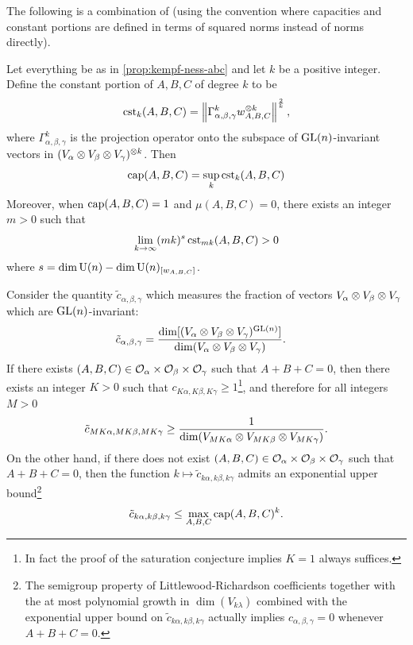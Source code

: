 \documentclass[notitlepage, 10pt]{article}
\begin{document}
The following is a combination of \cite[Theorem 1 \& Proposition 3.1]{franks2020minimal} (using the convention where capacities and constant portions are defined in terms of squared norms instead of norms directly).
\begin{thm}
    Let everything be as in \cref{prop:kempf-ness-abc} and let $k$ be a positive integer.
    Define the constant portion of $A,B,C$ of degree $k$ to be
    \begin{equation}
        \operatorname{cst}_{k}(A,B,C) = \left\lVert\Gamma_{\alpha,\beta,\gamma}^{k} w_{A,B,C}^{\otimes k}\right\rVert^{\frac{2}{k}},
    \end{equation}
    where $\Gamma_{\alpha,\beta,\gamma}^{k}$ is the projection operator onto the subspace of $\operatorname{GL}(n)$-invariant vectors in $(V_{\alpha}\otimes V_{\beta} \otimes V_{\gamma})^{\otimes k}$.
    Then
    \begin{equation}
        \label{eq:strong_duality}
        \operatorname{cap}(A,B,C) = \sup_{k} \operatorname{cst}_{k}(A,B,C)
    \end{equation}
    Moreover, when $\operatorname{cap}(A,B,C) = 1$ and $\mu(A,B,C) = 0$, there exists an integer $m > 0$ such that
    \begin{equation}
        \label{eq:occasionality}
        \lim_{k\to\infty} (mk)^{s}\operatorname{cst}_{mk}(A,B,C) > 0
    \end{equation}
    where $s = \dim \operatorname{U}(n) - \dim \operatorname{U}(n)_{[w_{A,B,C}]}$.
\end{thm}
\begin{cor}
    Consider the quantity $\tilde c_{\alpha,\beta,\gamma}$ which measures the fraction of vectors $V_{\alpha} \otimes V_{\beta} \otimes V_{\gamma}$ which are $\operatorname{GL}(n)$-invariant:
    \begin{align}
        \tilde c_{\alpha, \beta, \gamma} 
        &= \frac{\dim[(V_{\alpha} \otimes V_{\beta} \otimes V_{\gamma})^{\operatorname{GL}(n)}]}{\dim(V_{\alpha} \otimes V_{\beta} \otimes V_{\gamma})}.
    \end{align}
    If there exists $(A,B,C)\in \mathcal O_{\alpha} \times \mathcal O_{\beta} \times \mathcal O_{\gamma}$ such that $A+B+C=0$, then there exists an integer $K > 0$ such that $c_{K\alpha,K\beta,K\gamma} \geq 1$\footnote{In fact the proof of the saturation conjecture implies $K = 1$ always suffices.}, and therefore for all integers $M > 0$
    \begin{equation}
        \tilde c_{MK\alpha, MK\beta, MK\gamma} \geq \frac{1}{\dim(V_{MK\alpha} \otimes V_{MK\beta} \otimes V_{MK\gamma})}.
    \end{equation}
    On the other hand, if there does not exist $(A,B,C) \in \mathcal O_{\alpha} \times \mathcal O_{\beta} \times \mathcal O_{\gamma}$ such that $A+B+C = 0$, then the function $k \mapsto \tilde c_{k\alpha, k\beta, k\gamma}$ admits an exponential upper bound\footnote{The semigroup property of Littlewood-Richardson coefficients together with the at most polynomial growth in $\dim(V_{k\lambda})$ combined with the exponential upper bound on $\tilde c_{k\alpha,k\beta,k\gamma}$ actually implies $c_{\alpha,\beta,\gamma} = 0$ whenever $A+B+C=0$.}
    \begin{equation}
        \tilde c_{k\alpha, k\beta, k\gamma} \leq \max_{A,B,C} \operatorname{cap}(A,B,C)^{k}.
    \end{equation}
\end{cor}
\end{document}
